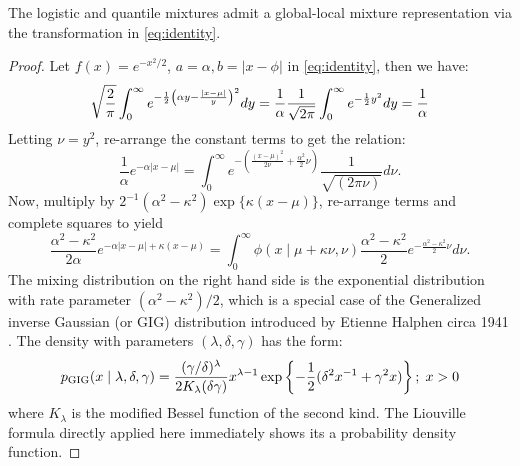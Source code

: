 \documentclass[lineno]{biometrika}
\begin{document}
\begin{lemma}
The logistic and quantile mixtures admit a global-local mixture representation via the \CS transformation in \eqref{eq:identity}. 
\end{lemma}
\begin{proof}
Let $f(x) = e^{-x^2/2}$, $a = \alpha, b = |x-\phi|$ in \eqref{eq:identity}, then we have: 
$$
\sqrt{\frac{2}{\pi}} \int_{0}^{\infty} e^{-\frac{1}{2} \left(\alpha y - \frac{|x-\mu|}{y} \right)^2} dy = \frac{1}{\alpha}\frac{1}{\sqrt{2\pi}} \int_0^{\infty} e^{-\frac{1}{2} y^2} dy = \frac{1}{\alpha}
$$
Letting $\nu = y^2$, re-arrange the constant terms to get the relation:
$$
\frac{1}{\alpha} e^{-\alpha|x-\mu|} = \int_{0}^{\infty} e^{-\left( \frac{(x-\mu)^2}{2\nu} + \frac{\alpha^2}{2} \nu \right)} \frac{1}{\sqrt{(2\pi\nu)}} d\nu.
$$
Now, multiply by $2^{-1}(\alpha^2-\kappa^2) \exp\{\kappa(x-\mu)\}$, re-arrange terms and complete squares to yield 
\begin{equation*}
  \frac{\alpha^2-\kappa^2}{2\alpha} e^{-\alpha|x-\mu| + \kappa(x-\mu)} = \int_0^{\infty} \phi(x \mid \mu + \kappa \nu, \nu) \frac{\alpha^2-\kappa^2}{2} e^{-\frac{\alpha^2-\kappa^2}{2} \nu} d \nu. 
\end{equation*}
The mixing distribution on the right hand side is the exponential distribution with rate parameter $(\alpha^2-\kappa^2)/2$, which is a special case of the Generalized inverse Gaussian (or GIG) distribution introduced by Etienne Halphen circa 1941 \citep{seshadri1997halphen}. The density with parameters $(\lambda, \delta, \gamma)$ has the form: 
$$
p_{\mathrm{GIG}}(x \mid \lambda, \delta, \gamma) = \frac{(\gamma/\delta)^{\lambda}}{2K_{\lambda}(\delta \gamma)} x^{\lambda-1} \exp \left\{ -\frac{1}{2} (\delta^2 x^{-1} + 
\gamma^2 x )  \right\}; \; x > 0
$$
where $K_{\lambda}$ is the modified Bessel function of the second kind. The Liouville formula directly applied here immediately shows its a probability density function. 


\end{proof}
\end{document}
